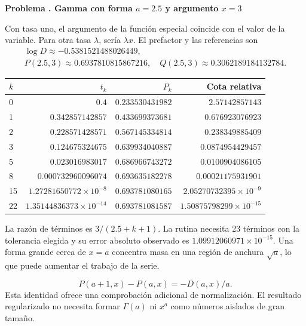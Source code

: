 \documentclass[11pt,a4paper]{article}
\theoremstyle{definition}
\newcounter{problema}
\newenvironment{resuelto}[1]{\refstepcounter{problema}\par\medskip\Needspace{6\baselineskip}\textbf{Problema \theproblema. #1}\par}{\par\medskip}
\begin{document}
\begin{resuelto}{Gamma con forma $a=2.5$ y argumento $x=3$}
Con tasa uno, el argumento de la función especial coincide con el valor de la variable. Para otra tasa $\lambda$, sería $\lambda x$. El prefactor y las referencias son
\[
\begin{gathered}
\log D\approx-0.5381521488026449,\\
P(2.5,3)\approx0.6937810815867216,\quad Q(2.5,3)\approx0.3062189184132784.
\end{gathered}
\]

\begin{center}\small\begin{tabular}{lrrr}
\toprule
$k$ & $t_k$ & $P_k$ & Cota relativa\\\midrule
0 & $0.4$ & $0.233530431982$ & $2.57142857143$\\
1 & $0.342857142857$ & $0.433699373681$ & $0.676923076923$\\
2 & $0.228571428571$ & $0.567145334814$ & $0.238349885409$\\
3 & $0.124675324675$ & $0.639934040887$ & $0.0874954429457$\\
5 & $0.023016983017$ & $0.686966743272$ & $0.0100904086105$\\
8 & $0.000732960096074$ & $0.693635182278$ & $0.00021175931901$\\
15 & $1.27281650772\times10^{-8}$ & $0.693781080165$ & $2.05270732395\times10^{-9}$\\
22 & $1.35144836373\times10^{-14}$ & $0.693781081587$ & $1.50875798299\times10^{-15}$\\
\bottomrule\end{tabular}\end{center}

La razón de términos es $3/(2.5+k+1)$. La rutina necesita 23 términos con la tolerancia elegida y su error absoluto observado es $1.09912060971\times10^{-15}$. Una forma grande cerca de $x=a$ concentra masa en una región de anchura $\sqrt a$, lo que puede aumentar el trabajo de la serie.

\[
P(a+1,x)-P(a,x)=-D(a,x)/a.
\]
Esta identidad ofrece una comprobación adicional de normalización. El resultado regularizado no necesita formar $\Gamma(a)$ ni $x^a$ como números aislados de gran tamaño.
\end{resuelto}
\end{document}
